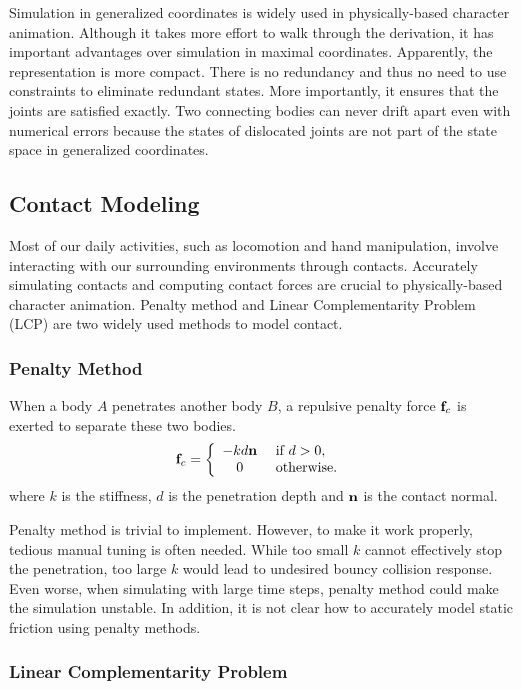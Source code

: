 Simulation in generalized coordinates is widely used in physically-based character animation. Although it takes more effort to walk through the derivation, it has important advantages over simulation in maximal coordinates. Apparently, the representation is more compact. There is no redundancy and thus no need to use constraints to eliminate redundant states. More importantly, it ensures that the joints are satisfied exactly. Two connecting bodies can never drift apart even with numerical errors because the states of dislocated joints are not part of the state space in generalized coordinates.

\subsection{Contact Modeling}

Most of our daily activities, such as locomotion and hand manipulation, involve interacting with our surrounding environments through contacts. Accurately simulating contacts and computing contact forces are crucial to physically-based character animation. Penalty method and Linear Complementarity Problem (LCP) are two widely used methods to model contact.

\subsubsection{Penalty Method}
When a body $A$ penetrates another body $B$, a repulsive penalty force $\mathbf{f}_c$ is exerted to separate these two bodies.
\begin{equation}
\mathbf{f}_c=
\left\{
\begin{array}{cl}
-kd\mathbf{n} & \textrm{        if } d > 0,\\
0 & \textrm{        otherwise.}
\end{array}
\right.
\end{equation}
where $k$ is the stiffness, $d$ is the penetration depth and $\mathbf{n}$ is the contact normal. 

Penalty method is trivial to implement. However, to make it work properly, tedious manual tuning is often needed. While too small $k$ cannot effectively stop the penetration, too large $k$ would lead to undesired bouncy collision response. Even worse, when simulating with large time steps, penalty method could make the simulation unstable. In addition, it is not clear how to accurately model static friction using penalty methods.

\subsubsection{Linear Complementarity Problem}


